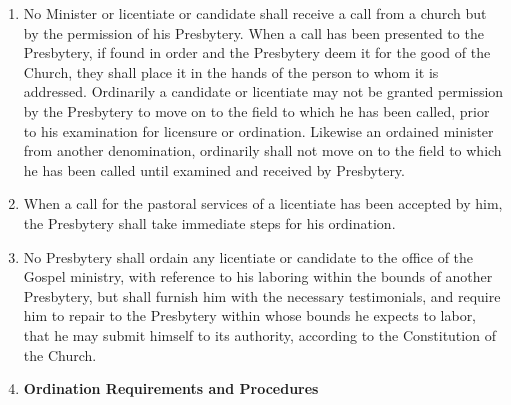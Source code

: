 \documentclass[
]{book}
\begin{document}
\protect\hypertarget{chapter-slug-23-the-ordination-and-installation-of-ministers}{\href{}{}}

\begin{enumerate}
\def\labelenumi{\arabic{enumi}.}
\item
  \protect\hypertarget{23}{\href{}{}}No Minister or licentiate or candidate shall receive a call from a church but by the permission of his Presbytery. When a call has been presented to the Presbytery, if found in order and the Presbytery deem it for the good of the Church, they shall place it in the hands of the person to whom it is addressed. Ordinarily a candidate or licentiate may not be granted permission by the Presbytery to move on to the field to which he has been called, prior to his examination for licensure or ordination. Likewise an ordained minister from another denomination, ordinarily shall not move on to the field to which he has been called until examined and received by Presbytery.
\item
  When a call for the pastoral services of a licentiate has been accepted by him, the Presbytery shall take immediate steps for his ordination.
\item
  No Presbytery shall ordain any licentiate or candidate to the office of the Gospel ministry, with reference to his laboring within the bounds of another Presbytery, but shall furnish him with the necessary testimonials, and require him to repair to the Presbytery within whose bounds he expects to labor, that he may submit himself to its authority, according to the Constitution of the Church.
\item
  \protect\hypertarget{23.4}{\href{}{}}\textbf{Ordination Requirements and Procedures}


\end{enumerate}
\end{document}
